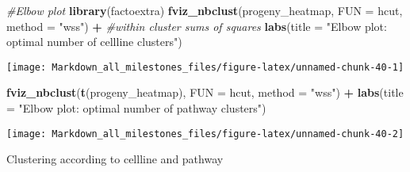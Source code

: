 \documentclass[]{article}
\newenvironment{Shaded}{\begin{snugshade}}{\end{snugshade}}
\newcommand{\CommentTok}[1]{\textcolor[rgb]{0.56,0.35,0.01}{\textit{#1}}}
\newcommand{\DataTypeTok}[1]{\textcolor[rgb]{0.13,0.29,0.53}{#1}}
\newcommand{\KeywordTok}[1]{\textcolor[rgb]{0.13,0.29,0.53}{\textbf{#1}}}
\newcommand{\NormalTok}[1]{#1}
\newcommand{\OperatorTok}[1]{\textcolor[rgb]{0.81,0.36,0.00}{\textbf{#1}}}
\newcommand{\StringTok}[1]{\textcolor[rgb]{0.31,0.60,0.02}{#1}}
\begin{document}
\begin{Shaded}
\begin{Highlighting}[]
\CommentTok{#Elbow plot}
\KeywordTok{library}\NormalTok{(factoextra)}
\KeywordTok{fviz_nbclust}\NormalTok{(progeny_heatmap, }
             \DataTypeTok{FUN =}\NormalTok{ hcut, }
             \DataTypeTok{method =} \StringTok{"wss"}\NormalTok{) }\OperatorTok{+}\StringTok{ }\CommentTok{#within cluster sums of squares}
\StringTok{  }\KeywordTok{labs}\NormalTok{(}\DataTypeTok{title =} \StringTok{"Elbow plot: optimal number of cellline clusters"}\NormalTok{)}
\end{Highlighting}
\end{Shaded}

\begin{center}\texttt{[image: Markdown\_all\_milestones\_files/figure-latex/unnamed-chunk-40-1]} \end{center}

\begin{Shaded}
\begin{Highlighting}[]
\KeywordTok{fviz_nbclust}\NormalTok{(}\KeywordTok{t}\NormalTok{(progeny_heatmap), }
             \DataTypeTok{FUN =}\NormalTok{ hcut, }
             \DataTypeTok{method =} \StringTok{"wss"}\NormalTok{) }\OperatorTok{+}
\StringTok{  }\KeywordTok{labs}\NormalTok{(}\DataTypeTok{title =} \StringTok{"Elbow plot: optimal number of pathway clusters"}\NormalTok{)}
\end{Highlighting}
\end{Shaded}

\begin{center}\texttt{[image: Markdown\_all\_milestones\_files/figure-latex/unnamed-chunk-40-2]} \end{center}

Clustering according to cellline and pathway
\end{document}
